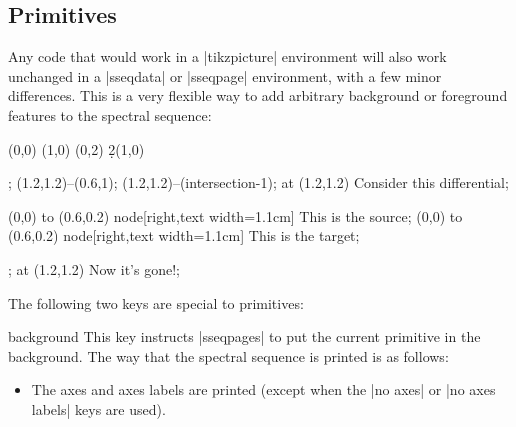 \documentclass{ltxdoc}
\begin{document}
\begin{sseqdata}[name=ex1,degree={#1}{1-#1}]
\subsection{\tikzname\space Primitives}
Any code that would work in a |tikzpicture| environment will also work unchanged in a |sseqdata| or |sseqpage| environment, with a few minor differences. This is a very flexible way to add arbitrary background or foreground features to the spectral sequence:
\begin{codeexample}[]
\begin{sseqdata}[name=tikz example,Adams grading,x range={0}{2}, x axis extend end=2em,math nodes=false]
\class(0,0)
\class[alias=start](1,0)
\class[alias=end](0,2)
\d2(1,0)
\end{sseqdata}
%
\begin{sseqpage}[name=tikz example]
\begin{scope}[blue,font=\tiny]
\node[name path=myellipse, draw, ellipse, inner sep=4pt, scale=0.7, rotate fit=26.5,
      fit=(start) (end)] {};
\path[name path=myline](1.2,1.2)--(0.6,1);
\draw[->,name intersections={of=myellipse and myline}] (1.2,1.2)--(intersection-1);
\node[right,text width=1.6cm] at (1.2,1.2) {Consider this differential};
\end{scope}
\end{sseqpage}
%
\begin{sseqpage}[name=tikz example]
\begin{scope}[<-,blue,font=\tiny]
\draw[xshift=1](0,0) to (0.6,0.2) node[right,text width=1.1cm] {This is the source};
\draw[yshift=2](0,0) to (0.6,0.2) node[right,text width=1.1cm] {This is the target};
\end{scope}
\end{sseqpage}
%
\begin{sseqpage}[page=3,name=tikz example]
\node[draw,ellipse,blue,inner sep=4pt,scale=0.7,rotate fit=26.5,fit=(start) (end)] {};
\node[right,blue,font=\tiny] at (1.2,1.2) {Now it's gone!};
\end{sseqpage}
\end{codeexample}

The following two keys are special to \tikzname\space primitives:
\begin{key}{background}
This key instructs |sseqpages| to put the current \tikzname\space primitive in the background. The way that the spectral sequence is printed is as follows:
\begin{itemize}
\item The axes and axes labels are printed (except when the |no axes| or |no axes labels| keys are used).


\end{itemize}
\end{key}
\end{sseqdata}
\end{document}
